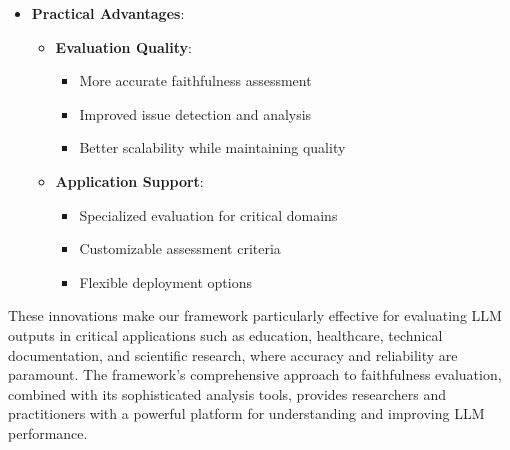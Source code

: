 \begin{itemize}
    \item \textbf{Practical Advantages}:
    \begin{itemize}
        \item \textbf{Evaluation Quality}:
        \begin{itemize}
            \item More accurate faithfulness assessment
            \item Improved issue detection and analysis
            \item Better scalability while maintaining quality
        \end{itemize}
        \item \textbf{Application Support}:
        \begin{itemize}
            \item Specialized evaluation for critical domains
            \item Customizable assessment criteria
            \item Flexible deployment options
        \end{itemize}
    \end{itemize}
\end{itemize}

These innovations make our framework particularly effective for evaluating LLM outputs in critical applications such as education, healthcare, technical documentation, and scientific research, where accuracy and reliability are paramount. The framework's comprehensive approach to faithfulness evaluation, combined with its sophisticated analysis tools, provides researchers and practitioners with a powerful platform for understanding and improving LLM performance.